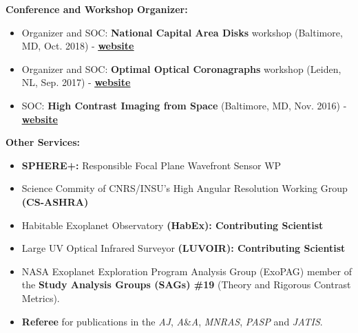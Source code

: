 \documentclass[11pt]{article}
\begin{document}
\textbf{Conference and Workshop Organizer:}
\begin{itemize} \itemsep -1pt
 \item \small Organizer and SOC: \textbf{National Capital Area Disks} workshop (Baltimore, MD, Oct. 2018) - \href{https://sites.google.com/view/ncad7-at-jhu/ncad7}{\underline{\textbf{website}}}
 \item \small Organizer and SOC: \textbf{Optimal Optical Coronagraphs} workshop (Leiden, NL, Sep. 2017) - \href{https://www.lorentzcenter.nl/lc/web/2017/924/info.php3?wsid=924&venue=Snellius}{\underline{\textbf{website}}}
 \item \small SOC: \textbf{High Contrast Imaging from Space} (Baltimore, MD, Nov. 2016) - \href{http://www.cvent.com/events/high-contrast-imaging-in-space-workshop/event-summary-eb3bb6bd54a342c5a15678daa49be683.aspx}{\underline{\textbf{website}}}
\end{itemize}
\vspace{0.1cm}
\textbf{Other Services:}
\begin{itemize} \itemsep -2pt
    \item \small \textbf{SPHERE+:} Responsible Focal Plane Wavefront Sensor WP
    \item \small Science Commity of CNRS/INSU's High Angular Resolution Working Group \textbf{(CS-ASHRA)}
    \item \small Habitable Exoplanet Observatory \textbf{(HabEx): Contributing Scientist}
    \item \small Large UV Optical Infrared Surveyor \textbf{(LUVOIR): Contributing Scientist}
    \item \small NASA Exoplanet Exploration Program Analysis Group (ExoPAG) member of the \textbf{Study Analysis Groups (SAGs) \#19} (Theory and Rigorous Contrast Metrics).
    \item \small \textbf{Referee} for publications in the \textit{AJ}, \textit{A}\&\textit{A}, \textit{MNRAS}, \textit{PASP} and \textit{JATIS}.
\end{itemize}
\end{document}
